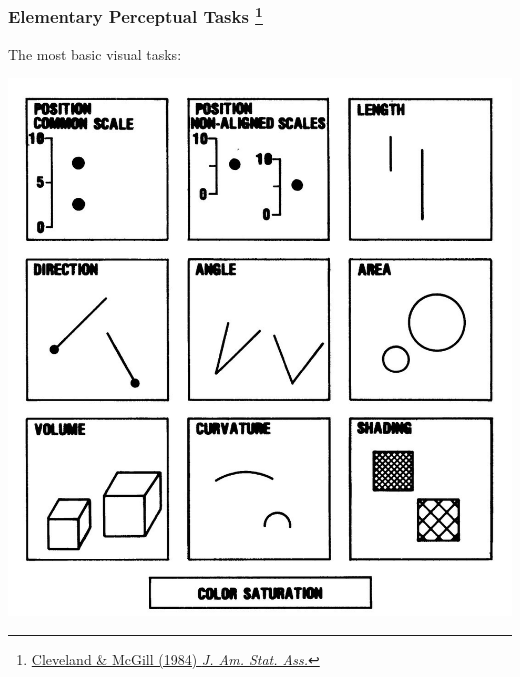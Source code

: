 
\begin{frame}
  \frametitle{Elementary Perceptual Tasks
  \footnote{\tiny{\href{https://www.jstor.org/stable/2288400}{Cleveland \& McGill (1984) \textit{J. Am. Stat. Ass.}}}}
  }
  \textcolor{hutton_green}{The most basic visual tasks:}
  \begin{center}
    \includegraphics[height=0.7\textheight]{images/elementary_perceptual_tasks}
  \end{center}
\end{frame}

